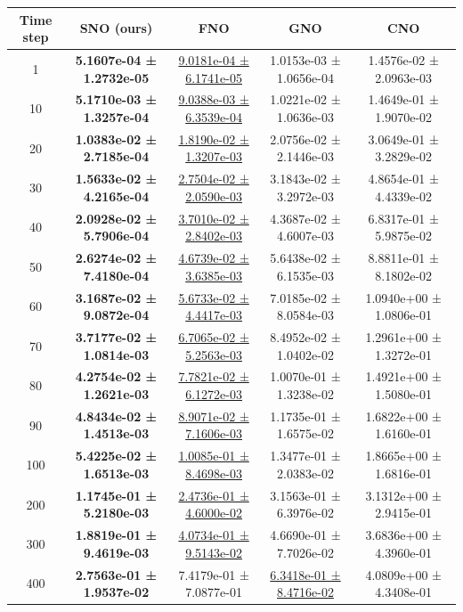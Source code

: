 \documentclass{article}
\theoremstyle{plain}
\theoremstyle{definition}
\theoremstyle{remark}
\begin{document}
\begin{table}[htbp]
\centering
\small
\setlength{\tabcolsep}{6pt}
\begin{tabular}{ccccc}
\hline
Time step & SNO (ours) & FNO & GNO & CNO \\
\hline
1   & \textbf{5.1607e-04 ± 1.2732e-05} & \underline{9.0181e-04 ± 6.1741e-05} & 1.0153e-03 ± 1.0656e-04 & 1.4576e-02 ± 2.0963e-03 \\
10  & \textbf{5.1710e-03 ± 1.3257e-04} & \underline{9.0388e-03 ± 6.3539e-04} & 1.0221e-02 ± 1.0636e-03 & 1.4649e-01 ± 1.9070e-02 \\
20  & \textbf{1.0383e-02 ± 2.7185e-04} & \underline{1.8190e-02 ± 1.3207e-03} & 2.0756e-02 ± 2.1446e-03 & 3.0649e-01 ± 3.2829e-02 \\
30  & \textbf{1.5633e-02 ± 4.2165e-04} & \underline{2.7504e-02 ± 2.0590e-03} & 3.1843e-02 ± 3.2972e-03 & 4.8654e-01 ± 4.4339e-02 \\
40  & \textbf{2.0928e-02 ± 5.7906e-04} & \underline{3.7010e-02 ± 2.8402e-03} & 4.3687e-02 ± 4.6007e-03 & 6.8317e-01 ± 5.9875e-02 \\
50  & \textbf{2.6274e-02 ± 7.4180e-04} & \underline{4.6739e-02 ± 3.6385e-03} & 5.6438e-02 ± 6.1535e-03 & 8.8811e-01 ± 8.1802e-02 \\
60  & \textbf{3.1687e-02 ± 9.0872e-04} & \underline{5.6733e-02 ± 4.4417e-03} & 7.0185e-02 ± 8.0584e-03 & 1.0940e+00 ± 1.0806e-01 \\
70  & \textbf{3.7177e-02 ± 1.0814e-03} & \underline{6.7065e-02 ± 5.2563e-03} & 8.4952e-02 ± 1.0402e-02 & 1.2961e+00 ± 1.3272e-01 \\
80  & \textbf{4.2754e-02 ± 1.2621e-03} & \underline{7.7821e-02 ± 6.1272e-03} & 1.0070e-01 ± 1.3238e-02 & 1.4921e+00 ± 1.5080e-01 \\
90  & \textbf{4.8434e-02 ± 1.4513e-03} & \underline{8.9071e-02 ± 7.1606e-03} & 1.1735e-01 ± 1.6575e-02 & 1.6822e+00 ± 1.6160e-01 \\
100 & \textbf{5.4225e-02 ± 1.6513e-03} & \underline{1.0085e-01 ± 8.4698e-03} & 1.3477e-01 ± 2.0383e-02 & 1.8665e+00 ± 1.6816e-01 \\
200 & \textbf{1.1745e-01 ± 5.2180e-03} & \underline{2.4736e-01 ± 4.6000e-02} & 3.1563e-01 ± 6.3976e-02 & 3.1312e+00 ± 2.9415e-01 \\
300 & \textbf{1.8819e-01 ± 9.4619e-03} & \underline{4.0734e-01 ± 9.5143e-02} & 4.6690e-01 ± 7.7026e-02 & 3.6836e+00 ± 4.3960e-01 \\
400 & \textbf{2.7563e-01 ± 1.9537e-02} & 7.4179e-01 ± 7.0877e-01 & \underline{6.3418e-01 ± 8.4716e-02} & 4.0809e+00 ± 4.3408e-01 \\

\end{tabular}
\end{table}
\end{document}
